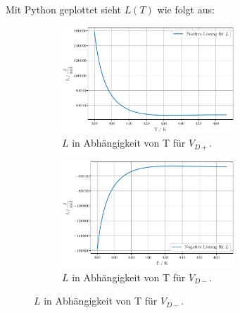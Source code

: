 \newpage
Mit Python geplottet sieht $L(T)$ wie folgt aus:
\begin{figure}
  \begin{subfigure}{0.4\textwidth}
  \centering
  \includegraphics[height=4cm]{plote.pdf}
  \caption{$L$ in Abhängigkeit von T für $V_{D+}$.}
  \label{fig:Verdampfungswärme1}
  \end{subfigure}
  \hfill
  \begin{subfigure}{0.4\textwidth}
  \centering
  \includegraphics[height=4cm]{plotf.pdf}
  \caption{$L$ in Abhängigkeit von T für $V_{D-}$.}
  \label{fig:Verdampfungswärme2}
  \end{subfigure}
\end{figure}
